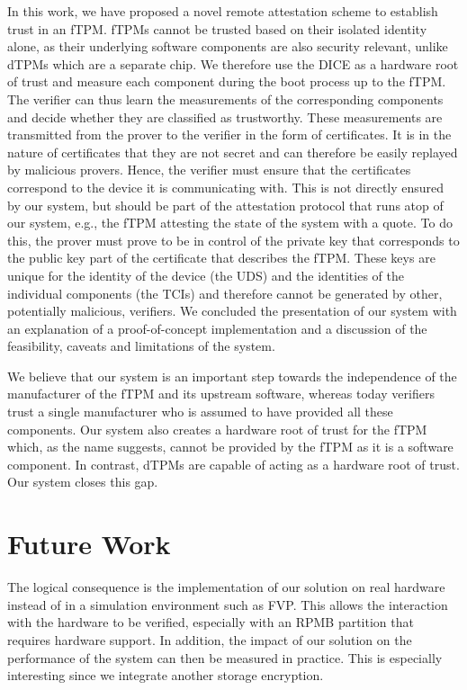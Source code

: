 In this work, we have proposed a novel remote attestation scheme to establish trust in an \ac{fTPM}\@.
\Acp{fTPM} cannot be trusted based on their isolated identity alone, as their underlying software components are also security relevant, unlike \acp{dTPM} which are a separate chip.
We therefore use the \ac{DICE} as a hardware root of trust and measure each component during the boot process up to the \ac{fTPM}\@.
The verifier can thus learn the measurements of the corresponding components and decide whether they are classified as trustworthy.
These measurements are transmitted from the prover to the verifier in the form of certificates.
It is in the nature of certificates that they are not secret and can therefore be easily replayed by malicious provers.
Hence, the verifier must ensure that the certificates correspond to the device it is communicating with.
This is not directly ensured by our system, but should be part of the attestation protocol that runs atop of our system, e.g., the \ac{fTPM} attesting the state of the system with a quote.
To do this, the prover must prove to be in control of the private key that corresponds to the public key part of the certificate that describes the \ac{fTPM}\@.
These keys are unique for the identity of the device (the \ac{UDS}) and the identities of the individual components (the \acp{TCI}) and therefore cannot be generated by other, potentially malicious, verifiers.
We concluded the presentation of our system with an explanation of a proof-of-concept implementation and a discussion of the feasibility, caveats and limitations of the system.

We believe that our system is an important step towards the independence of the manufacturer of the \ac{fTPM} and its upstream software, whereas today verifiers trust a single manufacturer who is assumed to have provided all these components.
Our system also creates a hardware root of trust for the \ac{fTPM} which, as the name suggests, cannot be provided by the \ac{fTPM} as it is a software component.
In contrast, \acp{dTPM} are capable of acting as a hardware root of trust.
Our system closes this gap.


\section{Future Work}

The logical consequence is the implementation of our solution on real hardware instead of in a simulation environment such as FVP\@.
This allows the interaction with the hardware to be verified, especially with an RPMB partition that requires hardware support.
In addition, the impact of our solution on the performance of the system can then be measured in practice.
This is especially interesting since we integrate another storage encryption.

